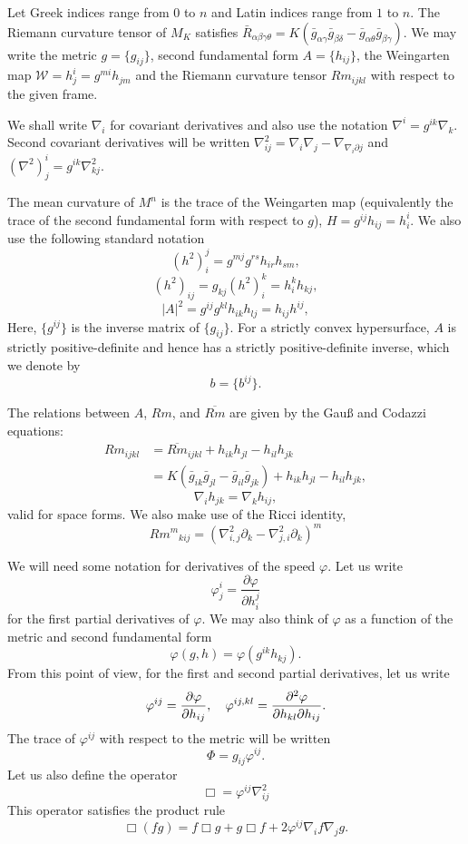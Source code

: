 \documentclass{amsart}
\begin{document}
Let Greek indices range from \(0\) to \(n\) and Latin indices range from \(1\) to \(n\). The Riemann curvature tensor of \(M_K\) satisfies \(\bar{R}_{\alpha\beta\gamma\theta} = K(\bar{g}_{\alpha\gamma}\bar{g}_{\beta\delta} - \bar{g}_{\alpha\theta}\bar{g}_{\beta\gamma})\). We may write the metric $g = \{g_{ij}\}$, second fundamental form $A = \{h_{ij}\}$, the Weingarten map $\mathcal{W} = h^i_j = g^{mi} h_{jm}$ and the Riemann curvature tensor $Rm_{ijkl}$ with respect to the given frame.

We shall write \(\nabla_i\) for covariant derivatives and also use the notation \(\nabla^i = g^{ik} \nabla_k\). Second covariant derivatives will be written \(\nabla^2_{ij} = \nabla_i \nabla_j - \nabla_{\nabla_i \partial j}\) and \((\nabla^2)^i_j = g^{ik} \nabla^2_{kj}\).

The mean curvature of $M^n$ is the trace of the Weingarten map (equivalently the trace of the second fundamental form with respect to $g$), $H = g^{ij}h_{ij} = h^i_i$. We also use the following standard notation
\[
(h^2)_i^j = g^{mj}g^{rs}h_{ir}h_{sm},
\]
\[
(h^2)_{ij} = g_{kj} (h^2)_i^k = h^k_i h_{kj},
\]
\[
|A|^2 = g^{ij}g^{kl}h_{ik}h_{lj} = h_{ij}h^{ij},
\]
Here, $\{g^{ij}\}$ is the inverse matrix of $\{g_{ij}\}.$ For a strictly convex hypersurface, \(A\) is strictly positive-definite and hence has a strictly positive-definite inverse, which we denote by
\[
b = \{b^{ij}\}.
\]

The relations between $A$, $Rm$, and $\overline{Rm}$ are given by the Gau{\ss} and Codazzi equations:
\[
\begin{split}
Rm_{ijkl} &= \overline{Rm}_{ijkl} + h_{ik}h_{jl} - h_{il}h_{jk} \\
&= K(\bar{g}_{ik}\bar{g}_{jl} - \bar{g}_{il}\bar{g}_{jk}) + h_{ik}h_{jl} - h_{il}h_{jk},
\end{split}
\]
\[
\nabla_i h_{jk} = \nabla_k h_{ij},
\]
valid for space forms. We also make use of the Ricci identity,
\[
{Rm^m}_{kij}  = \left(\nabla^2_{i, j} \partial_k - \nabla^2_{j,i} \partial_k\right)^m
\]

We will need some notation for derivatives of the speed \(\varphi\). Let us write
\[
\varphi^{i}_{j} = \frac{\partial \varphi}{\partial h^{j}_{i}}
\]
for the first partial derivatives of \(\varphi\). We may also think of \(\varphi\) as a function of the metric and second fundamental form
\[
\varphi(g, h) = \varphi(g^{ik} h_{kj}).
\]
From this point of view, for the first and second partial derivatives, let us write
\[
\varphi^{ij} = \frac{\partial\varphi}{\partial h_{ij}}, \quad \varphi^{ij,kl} = \frac{\partial^2\varphi}{\partial h_{kl} \partial h_{ij}}.
\]
The trace of \(\varphi^{ij}\) with respect to the metric will be written
\[
\Phi = g_{ij} \varphi^{ij}.
\]
Let us also define the operator
\[
\Box = \varphi^{ij} \nabla^2_{ij}
\]
This operator satisfies the product rule
\begin{equation}
\label{eq:productbox}
\Box (fg) = f \Box g + g \Box f + 2 \varphi^{ij} \nabla_i f \nabla_j g.
\end{equation}
\end{document}
